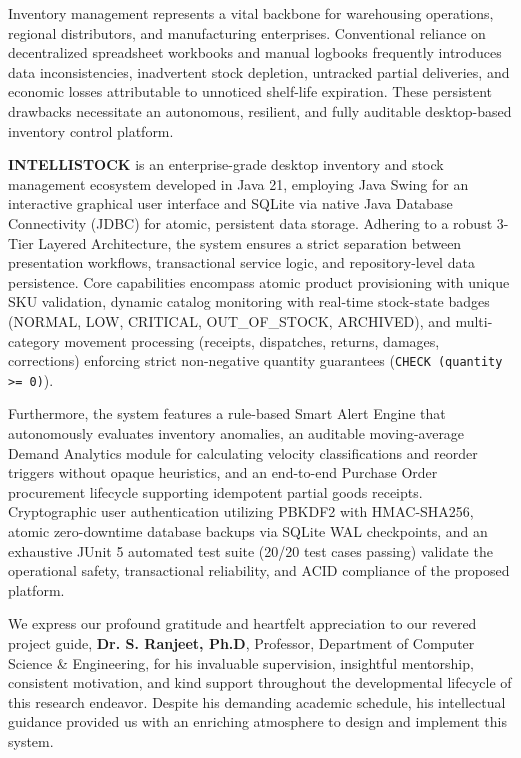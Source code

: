 \documentclass[BTech]{srmuthesis}
\begin{document}
\abstract
\begin{doublespacing}
{\large\noindent Inventory management represents a vital backbone for warehousing operations, regional distributors, and manufacturing enterprises. Conventional reliance on decentralized spreadsheet workbooks and manual logbooks frequently introduces data inconsistencies, inadvertent stock depletion, untracked partial deliveries, and economic losses attributable to unnoticed shelf-life expiration. These persistent drawbacks necessitate an autonomous, resilient, and fully auditable desktop-based inventory control platform.

\textbf{INTELLISTOCK} is an enterprise-grade desktop inventory and stock management ecosystem developed in Java 21, employing Java Swing for an interactive graphical user interface and SQLite via native Java Database Connectivity (JDBC) for atomic, persistent data storage. Adhering to a robust 3-Tier Layered Architecture, the system ensures a strict separation between presentation workflows, transactional service logic, and repository-level data persistence. Core capabilities encompass atomic product provisioning with unique SKU validation, dynamic catalog monitoring with real-time stock-state badges (NORMAL, LOW, CRITICAL, OUT\_OF\_STOCK, ARCHIVED), and multi-category movement processing (receipts, dispatches, returns, damages, corrections) enforcing strict non-negative quantity guarantees (\texttt{CHECK (quantity >= 0)}).

Furthermore, the system features a rule-based Smart Alert Engine that autonomously evaluates inventory anomalies, an auditable moving-average Demand Analytics module for calculating velocity classifications and reorder triggers without opaque heuristics, and an end-to-end Purchase Order procurement lifecycle supporting idempotent partial goods receipts. Cryptographic user authentication utilizing PBKDF2 with HMAC-SHA256, atomic zero-downtime database backups via SQLite WAL checkpoints, and an exhaustive JUnit 5 automated test suite (20/20 test cases passing) validate the operational safety, transactional reliability, and ACID compliance of the proposed platform.}
\end{doublespacing}

\pagebreak
\acknowledgements
We express our profound gratitude and heartfelt appreciation to our revered project guide, \textbf{Dr. S. Ranjeet, Ph.D}, Professor, Department of Computer Science \& Engineering, for his invaluable supervision, insightful mentorship, consistent motivation, and kind support throughout the developmental lifecycle of this research endeavor. Despite his demanding academic schedule, his intellectual guidance provided us with an enriching atmosphere to design and implement this system.
\end{document}
